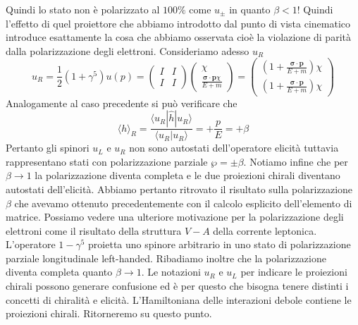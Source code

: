 Quindi lo stato non è polarizzato al $100\%$ come $u_{\pm}$ in quanto $\beta<1$! Quindi l'effetto di quel proiettore che abbiamo introdotto dal punto di vista cinematico introduce esattamente la cosa che abbiamo osservata cioè la violazione di parità dalla polarizzazione degli elettroni.
Consideriamo adesso $u_R$
$$
u_R = \frac{1}{2}(1 + \gamma^5) u(p) = \begin{pmatrix} I & I \\ I & I \end{pmatrix} \begin{pmatrix} \chi \\ \frac{\boldsymbol{\sigma} \cdot \mathbf{p}\chi}{E + m} \end{pmatrix} = \begin{pmatrix} \left(1 + \frac{\boldsymbol{\sigma} \cdot \mathbf{p}}{E + m}\right)\chi \\ \left(1 + \frac{\boldsymbol{\sigma} \cdot \mathbf{p}}{E + m}\right)\chi \end{pmatrix}
$$
Analogamente al caso precedente si può verificare che
$$
\langle h \rangle_R = \frac{\langle u_R | \hat{h} | u_R \rangle}{\langle u_R | u_R \rangle} = + \frac{p}{E} = +\beta
$$
Pertanto gli spinori $u_L$ e $u_R$ non sono autostati dell'operatore elicità tuttavia rappresentano stati con polarizzazione parziale $\wp=\pm\beta$. Notiamo infine che per $\beta\to1$ la polarizzazione diventa completa e le due proiezioni chirali diventano autostati dell'elicità. Abbiamo pertanto ritrovato il risultato sulla polarizzazione $\beta$ che avevamo ottenuto precedentemente con il calcolo esplicito dell'elemento di matrice. Possiamo vedere una ulteriore motivazione per la polarizzazione degli elettroni come il risultato della struttura $V-A$ della corrente leptonica. L'operatore $1-\gamma^5$ proietta uno spinore arbitrario in uno stato di polarizzazione parziale longitudinale left-handed. Ribadiamo inoltre che la polarizzazione diventa completa quanto $\beta\to 1$. Le notazioni $u_R$ e $u_L$ per indicare le proiezioni chirali possono generare confusione ed è per questo che bisogna tenere distinti i concetti di chiralità e elicità. L'Hamiltoniana delle interazioni debole contiene le proiezioni chirali. Ritorneremo su questo punto.

